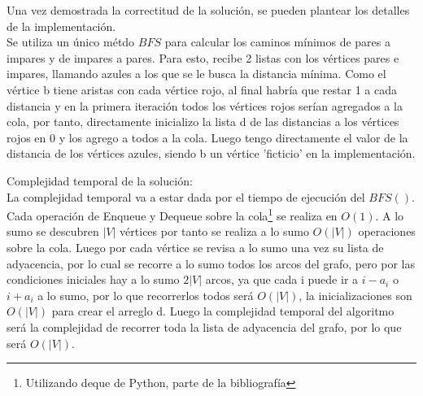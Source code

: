 \documentclass[12pt]{article}
\begin{document}
  Una vez demostrada la correctitud de la soluci\'on, se pueden plantear los detalles de la implementaci\'on.\\
  Se utiliza un \'unico m\'etdo $BFS$ para calcular los caminos m\'inimos de pares a impares y de impares a pares. Para esto, recibe 2 listas con los v\'ertices pares e impares, llamando azules a los que se le busca la distancia m\'inima. Como el v\'ertice b tiene aristas con cada v\'ertice rojo, al final habr\'ia que restar 1 a cada distancia y en la primera iteraci\'on todos los v\'ertices rojos ser\'ian agregados a la cola, por tanto, directamente inicializo la lista d de las distancias a los v\'ertices rojos en 0 y los agrego a todos a la cola. Luego tengo directamente el valor de la distancia de los v\'ertices azules, siendo b un v\'ertice 'ficticio' en la implementaci\'on.
  
  Complejidad temporal de la soluci\'on:\\
La complejidad temporal va a estar dada por el tiempo de ejecuci\'on del $BFS()$.
Cada operaci\'on de Enqueue y Dequeue sobre la cola\footnote{Utilizando deque de Python, parte de la bibliograf\'ia} se realiza en $O(1)$. A lo sumo se descubren $|V|$ v\'ertices por tanto se realiza
 a lo sumo $O(|V|)$ operaciones sobre la cola. Luego por cada  v\'ertice se revisa a lo sumo una vez su lista de adyacencia,
 por lo cual se recorre a lo sumo todos los arcos del grafo, pero por las condiciones iniciales hay a lo sumo $2|V|$ arcos, ya que cada i puede ir a $i-a_i$ o $i+a_i$ a lo sumo, por lo que recorrerlos todos ser\'a $O(|V|)$, la inicializaciones son $O(|V|)$ para crear el arreglo d. Luego la 
complejidad temporal del algoritmo ser\'a la complejidad de recorrer toda la lista de adyacencia del grafo, por lo que ser\'a $O(|V|)$.
\end{document}

